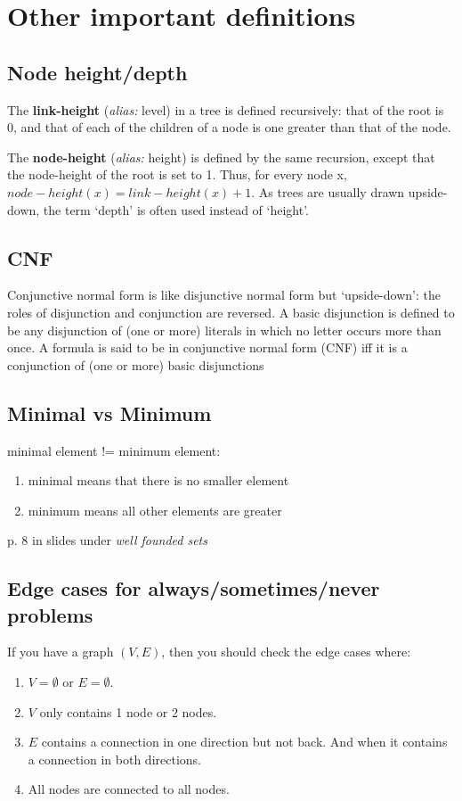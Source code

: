 \documentclass[twocolumn,a4paper]{article}
\begin{document}
\newpage
\section*{Other important definitions}
\subsection*{Node height/depth}
The \textbf{link-height} (\emph{alias:} level) in a tree is defined recursively: that of the root is 0,
and that of each of the children of a node is one greater than that of the node.

The \textbf{node-height} (\emph{alias:} height) is defined by the same recursion,
except that the node-height of the root is set to 1.
Thus, for every node x, \(node-height(x) = link-height(x) + 1\).
As trees are usually drawn upside-down, the term `depth' is often used instead of `height'.

\subsection*{CNF}
Conjunctive normal form is like disjunctive normal form but `upside-down': the roles of disjunction and conjunction are reversed.
A basic disjunction is defined to be any disjunction of (one or more) literals in which no letter occurs more than once.
A formula is said to be in conjunctive normal form (CNF) iff it is a conjunction of (one or more) basic disjunctions

\subsection*{Minimal vs Minimum}
minimal element != minimum element:
\begin{enumerate}
	\item minimal means that there is no smaller element
	\item minimum means all other elements are greater
\end{enumerate}
p. 8 in slides under \emph{well founded sets}

\subsection*{Edge cases for always/sometimes/never problems}
If you have a graph \((V, E)\), then you should check the edge cases where:
\begin{enumerate}
	\item \(V=\emptyset \) or \(E=\emptyset \).
	\item \(V\) only contains 1 node or 2 nodes.
	\item \(E\) contains a connection in one direction but not back. And when it contains a connection in both directions.
	\item All nodes are connected to all nodes.
\end{enumerate}
\end{document}
